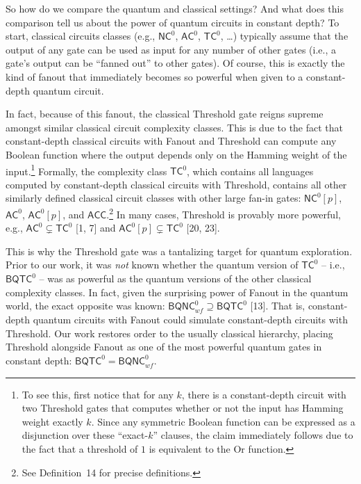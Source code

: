 \documentclass[10pt,a4paper]{article}
\begin{document}
So how do we compare the quantum and classical settings? And what does this comparison tell us about the power of quantum circuits in constant depth? To start, classical circuits classes (e.g., ${\mathsf{NC}}^{0}$, ${\mathsf{AC}}^{0}$, ${\mathsf{TC}}^{0}$, …) typically assume that the output of any gate can be used as input for any number of other gates (i.e., a gate’s output can be “fanned out” to other gates). Of course, this is exactly the kind of fanout that immediately becomes so powerful when given to a constant-depth quantum circuit.\par




In fact, because of this fanout, the classical Threshold gate reigns supreme amongst similar classical circuit complexity classes. This is due to the fact that constant-depth classical circuits with Fanout and Threshold can compute any Boolean function where the output depends only on the Hamming weight of the input.\footnote{To see this, first notice that for any $k$, there is a constant-depth circuit with two Threshold gates that computes whether or not the input has Hamming weight exactly $k$. Since any symmetric Boolean function can be expressed as a disjunction over these “exact-$k$” clauses, the claim immediately follows due to the fact that a threshold of $1$ is equivalent to the Or function.} Formally, the complexity class ${\mathsf{TC}}^{0}$, which contains all languages computed by constant-depth classical circuits with Threshold, contains all other similarly defined classical circuit classes with other large fan-in gates: ${\mathsf{NC}}^{0}[p]$, ${\mathsf{AC}}^{0}$, ${\mathsf{AC}}^{0}[p]$, and ${\mathsf{ACC}}$.\footnote{See Definition 14 for precise definitions.} In many cases, Threshold is provably more powerful, e.g., ${\mathsf{AC}}^{0}\subsetneq{\mathsf{TC}}^{0}$ [1, 7] and ${\mathsf{AC}}^{0}[p]\subsetneq{\mathsf{TC}}^{0}$ [20, 23].\par




This is why the Threshold gate was a tantalizing target for quantum exploration. Prior to our work, it was \emph{not} known whether the quantum version of ${\mathsf{TC}}^{0}$ – i.e., ${\mathsf{BQTC}}^{0}$ – was as powerful as the quantum versions of the other classical complexity classes. In fact, given the surprising power of Fanout in the quantum world, the exact opposite was known: ${\mathsf{BQNC}}^{0}_{wf}\supseteq{\mathsf{BQTC}}^{0}$ [13]. That is, constant-depth quantum circuits with Fanout could simulate constant-depth circuits with Threshold. Our work restores order to the usually classical hierarchy, placing Threshold alongside Fanout as one of the most powerful quantum gates in constant depth: ${\mathsf{BQTC}}^{0}={\mathsf{BQNC}}^{0}_{wf}$.\par
\end{document}
